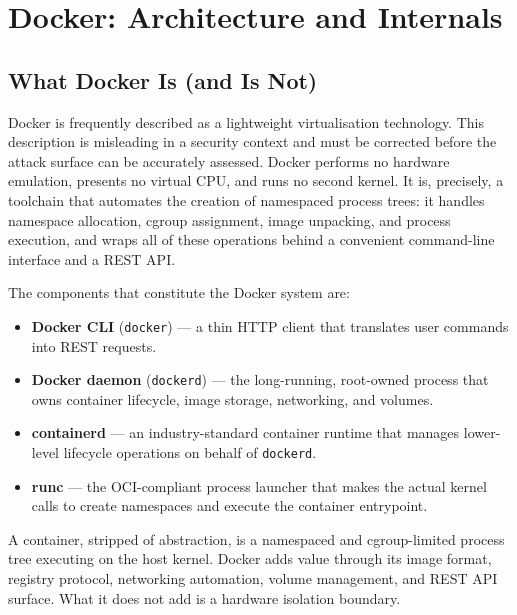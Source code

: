 
\chapter{Docker: Architecture and Internals}

\section{What Docker Is (and Is Not)}

Docker is frequently described as a lightweight virtualisation technology. This
description is misleading in a security context and must be corrected before the
attack surface can be accurately assessed. Docker performs no hardware emulation,
presents no virtual CPU, and runs no second kernel. It is, precisely, a toolchain
that automates the creation of namespaced process trees: it handles namespace
allocation, cgroup assignment, image unpacking, and process execution, and wraps all
of these operations behind a convenient command-line interface and a REST API.

The components that constitute the Docker system are:

\begin{itemize}
    \item \textbf{Docker CLI} (\texttt{docker}) --- a thin HTTP client that
          translates user commands into REST requests.
    \item \textbf{Docker daemon} (\texttt{dockerd}) --- the long-running, root-owned
          process that owns container lifecycle, image storage, networking, and
          volumes.
    \item \textbf{containerd} --- an industry-standard container runtime that manages
          lower-level lifecycle operations on behalf of \texttt{dockerd}.
    \item \textbf{runc} --- the OCI-compliant process launcher that makes the actual
          kernel calls to create namespaces and execute the container entrypoint.
\end{itemize}

A container, stripped of abstraction, is a namespaced and cgroup-limited process tree
executing on the host kernel. Docker adds value through its image format, registry
protocol, networking automation, volume management, and REST API surface. What it
does not add is a hardware isolation boundary.

